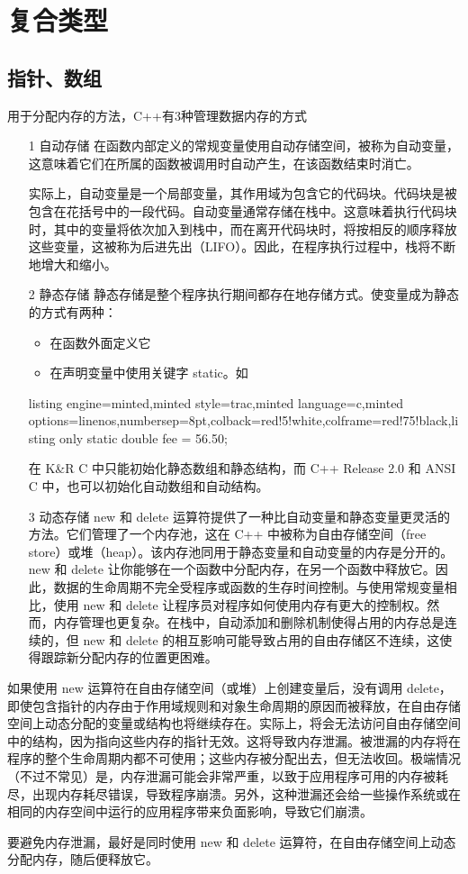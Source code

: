 \chapter{复合类型}
\section{指针、数组}
用于分配内存的方法，C++有3种管理数据内存的方式
\begin{enumerate}
	\item[1] 自动存储
	在函数内部定义的常规变量使用自动存储空间，被称为自动变量，这意味着它们在所属的函数被调用时自动产生，在该函数结束时消亡。
	
	实际上，自动变量是一个局部变量，其作用域为包含它的代码块。代码块是被包含在花括号中的一段代码。自动变量通常存储在栈中。这意味着执行代码块时，其中的变量将依次加入到栈中，而在离开代码块时，将按相反的顺序释放这些变量，这被称为后进先出（LIFO）。因此，在程序执行过程中，栈将不断地增大和缩小。
	\item[2] 静态存储
	静态存储是整个程序执行期间都存在地存储方式。使变量成为静态的方式有两种：
	\begin{itemize}
		\item 在函数外面定义它
		\item 在声明变量中使用关键字 static。如
	\end{itemize}
\begin{tcblisting}{listing engine=minted,minted style=trac,minted language=c,minted options={linenos,numbersep=8pt},colback=red!5!white,colframe=red!75!black,listing only}
		static double fee = 56.50;
\end{tcblisting} 
	在 K\&R C 中只能初始化静态数组和静态结构，而 C++ Release 2.0 和 ANSI C 中，也可以初始化自动数组和自动结构。
	\item[3] 动态存储
	new 和 delete 运算符提供了一种比自动变量和静态变量更灵活的方法。它们管理了一个内存池，这在 C++ 中被称为自由存储空间（free store）或堆（heap）。该内存池同用于静态变量和自动变量的内存是分开的。new 和 delete 让你能够在一个函数中分配内存，在另一个函数中释放它。因此，数据的生命周期不完全受程序或函数的生存时间控制。与使用常规变量相比，使用 new 和 delete 让程序员对程序如何使用内存有更大的控制权。然而，内存管理也更复杂。在栈中，自动添加和删除机制使得占用的内存总是连续的，但 new 和 delete 的相互影响可能导致占用的自由存储区不连续，这使得跟踪新分配内存的位置更困难。	
\end{enumerate}
\begin{tcolorbox}[title=栈、堆和内存泄露,colback=yellow!5,center title]
	如果使用 new 运算符在自由存储空间（或堆）上创建变量后，没有调用 delete，即使包含指针的内存由于作用域规则和对象生命周期的原因而被释放，在自由存储空间上动态分配的变量或结构也将继续存在。实际上，将会无法访问自由存储空间中的结构，因为指向这些内存的指针无效。这将导致内存泄漏。被泄漏的内存将在程序的整个生命周期内都不可使用；这些内存被分配出去，但无法收回。极端情况（不过不常见）是，内存泄漏可能会非常严重，以致于应用程序可用的内存被耗尽，出现内存耗尽错误，导致程序崩溃。另外，这种泄漏还会给一些操作系统或在相同的内存空间中运行的应用程序带来负面影响，导致它们崩溃。
	
	要避免内存泄漏，最好是同时使用 new 和 delete 运算符，在自由存储空间上动态分配内存，随后便释放它。
\end{tcolorbox}

